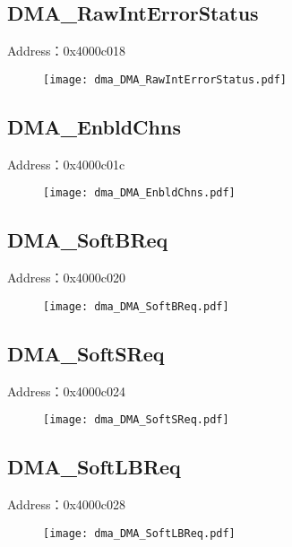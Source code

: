 \subsection{DMA\_RawIntErrorStatus}
\label{dma-DMA-RawIntErrorStatus}
Address：0x4000c018
 \begin{figure}[H]
\texttt{[image: dma\_DMA\_RawIntErrorStatus.pdf]}
\end{figure}

\subsection{DMA\_EnbldChns}
\label{dma-DMA-EnbldChns}
Address：0x4000c01c
 \begin{figure}[H]
\texttt{[image: dma\_DMA\_EnbldChns.pdf]}
\end{figure}

\subsection{DMA\_SoftBReq}
\label{dma-DMA-SoftBReq}
Address：0x4000c020
 \begin{figure}[H]
\texttt{[image: dma\_DMA\_SoftBReq.pdf]}
\end{figure}

\subsection{DMA\_SoftSReq}
\label{dma-DMA-SoftSReq}
Address：0x4000c024
 \begin{figure}[H]
\texttt{[image: dma\_DMA\_SoftSReq.pdf]}
\end{figure}

\subsection{DMA\_SoftLBReq}
\label{dma-DMA-SoftLBReq}
Address：0x4000c028
 \begin{figure}[H]
\texttt{[image: dma\_DMA\_SoftLBReq.pdf]}
\end{figure}

